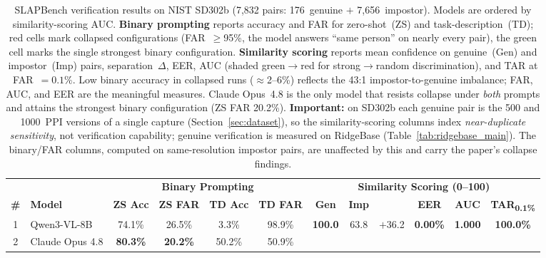 \documentclass[journal]{IEEEtran}
\begin{document}
\begin{table}[t]
\centering
\caption{SLAPBench verification results on NIST SD302b (7,832 pairs:
  176~genuine $+$ 7,656~impostor). Models are ordered by similarity-scoring
  AUC. \textbf{Binary prompting} reports accuracy and FAR for zero-shot~(ZS)
  and task-description~(TD); red cells mark collapsed configurations
  (FAR~$\geq$95\%, the model answers ``same person'' on nearly every pair),
  the green cell marks the single strongest binary configuration.
  \textbf{Similarity scoring} reports mean confidence on genuine~(Gen) and
  impostor~(Imp) pairs, separation~$\Delta$, EER, AUC (shaded green$\rightarrow$red
  for strong$\rightarrow$random discrimination), and TAR at FAR~$=0.1\%$.
  Low binary accuracy in collapsed runs ($\approx$2--6\%) reflects the
  43:1 impostor-to-genuine imbalance; FAR, AUC, and EER are the meaningful
  measures. Claude Opus~4.8 is the only model that resists collapse under
  \emph{both} prompts and attains the strongest binary configuration
  (ZS FAR 20.2\%).
  \textbf{Important:} on SD302b each genuine pair is the 500 and 1000~PPI
  versions of a single capture (Section~\ref{sec:dataset}), so the
  similarity-scoring columns index \emph{near-duplicate sensitivity}, not
  verification capability; genuine verification is measured on RidgeBase
  (Table~\ref{tab:ridgebase_main}). The binary/FAR columns, computed on
  same-resolution impostor pairs, are unaffected by this and carry the paper's
  collapse findings.}
\label{tab:main_results}
\renewcommand{\arraystretch}{1.25}
\setlength{\tabcolsep}{4.5pt}
\footnotesize
\begin{tabular}{c l cccc cccccc}
\toprule
& & \multicolumn{4}{c}{\cellcolor{grpBin}\textbf{Binary Prompting}}
  & \multicolumn{6}{c}{\cellcolor{grpScore}\textbf{Similarity Scoring (0--100)}} \\
\cmidrule(lr){3-6}\cmidrule(lr){7-12}
\textbf{\#} & \textbf{Model}
  & \textbf{ZS Acc} & \textbf{ZS FAR} & \textbf{TD Acc} & \textbf{TD FAR}
  & \textbf{Gen} & \textbf{Imp} & \boldmath{$\Delta$} & \textbf{EER}
  & \textbf{AUC} & \textbf{TAR\textsubscript{0.1\%}} \\
\midrule
1 & Qwen3-VL-8B
  & 74.1\% & 26.5\% & 3.3\% & \cellcolor{collapseRed}98.9\%
  & \textbf{100.0} & 63.8 & $+$36.2 & \textbf{0.00\%}
  & \cellcolor{aucPerfect}\textbf{1.000} & \textbf{100.0\%} \\
2 & Claude Opus 4.8
  & \textbf{80.3\%} & \cellcolor{funcGreen}\textbf{20.2\%} & 50.2\% & 50.9\%

\end{tabular}
\end{table}
\end{document}
